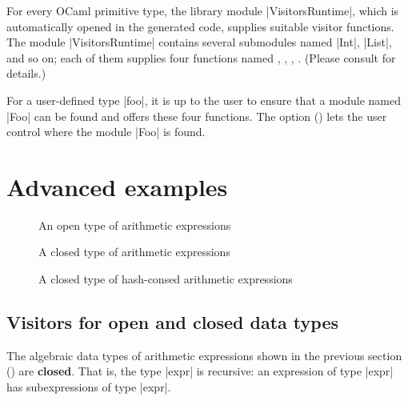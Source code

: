 \documentclass[11pt,a4paper,twoside]{article}
\renewcommand{\emph}[1]{\textbf{#1}}
\begin{document}
For every OCaml primitive type, the library module \oc|VisitorsRuntime|, which
is automatically opened in the generated code, supplies suitable visitor
functions. The module \oc|VisitorsRuntime| contains several submodules named
\oc|Int|, \oc|List|, and so on; each of them supplies four functions named
\iter, \map, \itertwo, \maptwo. (Please consult 
for details.)

For a user-defined type \oc|foo|, it is up to the user to ensure that a module
named \oc|Foo| can be found and offers these four functions. The \nonlocal
option () lets the user control where the module \oc|Foo|
is found.


\section{Advanced examples}
\label{sec:advanced}


\begin{figure}[p]
\vspace{-\baselineskip}
\caption{An open type of arithmetic expressions} %
\label{fig:expr12}
\end{figure}

\begin{figure}[p]
\caption{A closed type of arithmetic expressions}
\label{fig:expr13}
\end{figure}

\begin{figure}[p]
\caption{A closed type of hash-consed arithmetic expressions}
\label{fig:expr08}
\end{figure}

\subsection{Visitors for open and closed data types}
\label{sec:advanced:openclosed}

The algebraic data types of arithmetic expressions shown in the previous
section () are \emph{closed}. That is, the type \oc|expr|
is recursive: an expression of type \oc|expr| has subexpressions of type
\oc|expr|.
\end{document}
